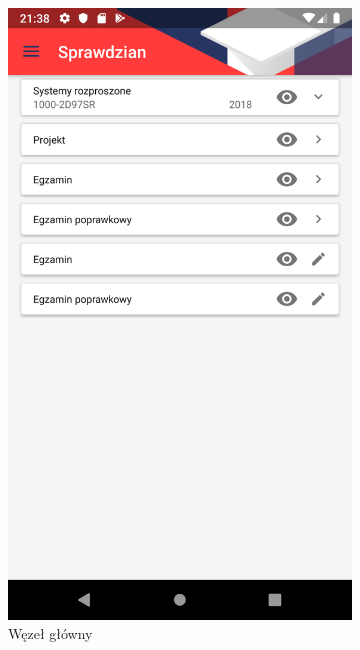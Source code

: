 \documentclass{pracamgr}
\begin{document}
\begin{figure}[p]
\begin{subfigure}[t]{0.3\textwidth}
		\includegraphics[width=\textwidth]{img/emptests_node.png}
		\caption{Węzeł główny}
		\label{fig:emptests_node}
	\end{subfigure}
	\\
	\begin{subfigure}[t]{0.3\textwidth}

\end{subfigure}
\end{figure}
\end{document}
